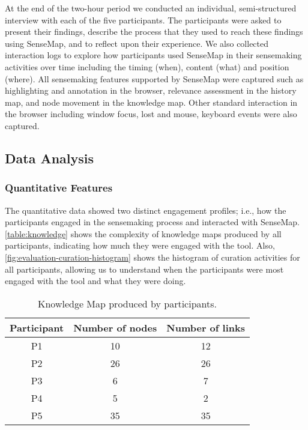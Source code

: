 At the end of the two-hour period we conducted an individual, semi-structured interview with each of the five participants. The participants were asked to present their findings, describe the process that they used to reach these findings using SenseMap, and to reflect upon their experience. We also collected interaction logs to explore how participants used SenseMap in their sensemaking activities over time including the timing (when), content (what) and position (where). All sensemaking features supported by SenseMap were captured such as highlighting and annotation in the browser, relevance assessment in the history map, and node movement in the knowledge map. Other standard interaction in the browser including window focus, lost and mouse, keyboard events were also captured.

\subsection{Data Analysis}

\subsubsection{Quantitative Features}
The quantitative data showed two distinct engagement profiles; i.e., how the participants engaged in the sensemaking process and interacted with SenseMap. \autoref{table:knowledge} shows the complexity of knowledge maps produced by all participants, indicating how much they were engaged with the tool. Also, \autoref{fig:evaluation-curation-histogram} shows the histogram of curation activities for all participants, allowing us to understand when the participants were most engaged with the tool and what they were doing.

\begin{table}[!htb]
	\centering
	\sffamily\small
	\caption{Knowledge Map produced by participants.}
	\label{table:knowledge}
	\begin{tabular}{ccc}
		\toprule
		\textbf{Participant} & \textbf{Number of nodes} & \textbf{Number of links} \\
		\midrule
		P1 & 10 & 12 \\
		P2 & 26 & 26 \\
		P3 & 6 & 7 \\
		P4 & 5 & 2 \\
		P5 & 35 & 35 \\
		\bottomrule
	\end{tabular}
\end{table}

